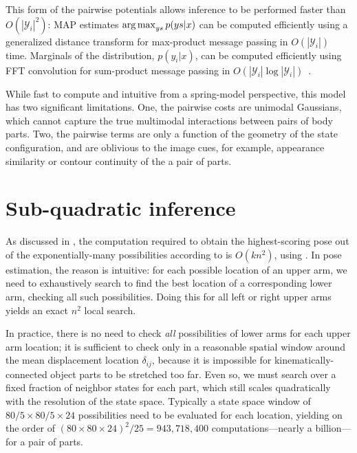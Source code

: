 {This form of the pairwise potentials allows inference to be performed faster than $O(|\mathcal{Y}_i|^2)$:  MAP estimates $\mathop{\arg\max}_{ys} p(ys | x)$ can be computed efficiently using a generalized distance transform for max-product message passing in $O(|\mathcal{Y}_i|)$ time.  Marginals of the distribution, $p(y_i | x)$, can be computed efficiently using FFT convolution for sum-product message passing in $O(|\mathcal{Y}_i| \log |\mathcal{Y}_i|)$~\cite{felz05}.

While fast to compute and intuitive from a spring-model perspective, this model has two significant limitations.  One, the pairwise costs are unimodal Gaussians, which cannot capture the true multimodal interactions between pairs of body parts.  Two, the pairwise terms are only a function of the geometry of the state configuration, and are oblivious to the image cues, for example, appearance similarity or contour continuity of the a pair of parts.
}

\section{Sub-quadratic inference}\label{sec:dt}

As discussed in , the computation required to obtain the 
highest-scoring pose out of the exponentially-many possibilities according to 
 is $O(kn^2)$, using .  In pose 
estimation, the reason is intuitive: for each possible location of an upper 
arm, we need to exhaustively search to find the best location of a 
corresponding lower arm, checking all such possibilities.  Doing this for all 
left or right upper arms yields an exact $n^2$ local search.

In practice, there is no need to check {\em all} possibilities of lower arms 
for each upper arm location; it is sufficient to check only in a reasonable 
spatial window around the mean displacement location $\delta_{ij}$, because it 
is impossible for kinematically-connected object parts to be stretched too far.  
Even so, we must search over a fixed fraction of neighbor states for each part, 
which still scales quadratically with the resolution of the state space.  
Typically a state space window of $80/5 \times 80/5 \times 24$ possibilities 
need to be evaluated for each location, yielding on the order of $ (80\times 80 
\times 24)^2 / 25 = 943,718,400$ computations---nearly a billion---for a pair 
of parts.

